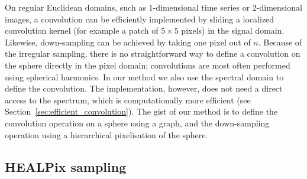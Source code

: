 \documentclass[final,twocolumn,3p,times,sort&compress]{elsarticle}
\newcommand{\secref}[1]{Section~\ref{sec:#1}}
\newcommand{\1}{\b{1}}              %
\newcommand{\0}{\b{0}}              %
\begin{document}
On regular Euclidean domains, such as 1-dimensional time series or 2-dimensional images, a convolution can be efficiently implemented by sliding a localized convolution kernel (for example a patch of $5 \times 5$ pixels) in the signal domain.
Likewise, down-sampling can be achieved by taking one pixel out of $n$.
Because of the irregular sampling, there is no straightforward way to define a convolution on the sphere directly in the pixel domain; convolutions are most often performed using spherical harmonics.
In our method we also use the spectral domain to define the convolution.
The implementation, however, does not need a direct access to the spectrum, which is computationally more efficient (see \secref{efficient_convolution}).
The gist of our method is to define the convolution operation on a sphere using a graph, and the down-sampling operation using a hierarchical pixelisation of the sphere.


\subsection{HEALPix sampling}
\label{sec:healpix}


\end{document}
